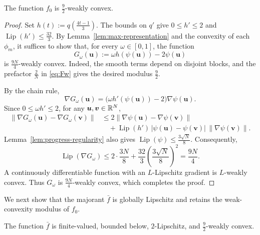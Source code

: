 \begin{lemma}
\label{lem:coupled-curvature}
The function $f_0$ is $\tfrac92$-weakly convex.
\end{lemma}
\begin{proof}
Set $h(t):=q(\tfrac{4t-1}{3})$. The bounds on $q'$ give $0\le h'\le2$ and
$\operatorname{Lip}(h')\le \tfrac{32}{3}$.
By Lemma~\ref{lem:max-representation} and the convexity
of each $\phi_m$, it suffices to show that, for every
$\omega\in[0,1]$, the function
\[
 G_\omega(\bm u)
 :=\omega h(\psi(\bm u))-2\psi(\bm u)
\]
is $\tfrac{9N}{4}$-weakly convex. Indeed, the smooth terms depend
on disjoint blocks, and the prefactor $\tfrac{2}{N}$ in
\eqref{eq:Fw} gives the desired modulus $\tfrac92$. 

By the chain rule,
\[
 \nabla G_\omega(\bm u)
 =
 \bigl(\omega h'(\psi(\bm u))-2\bigr)\nabla\psi(\bm u).
\]
Since $0\le\omega h'\le2$, for any $\bm u,\bm v\in{\mathbb{R}}^N$,
\begin{align*}
 \|\nabla G_\omega(\bm u)-\nabla G_\omega(\bm v)\|
 &\le
 2\|\nabla\psi(\bm u)-\nabla\psi(\bm v)\|\\
 &\quad+
 \operatorname{Lip}(h')\,|\psi(\bm u)-\psi(\bm v)|
 \,\|\nabla\psi(\bm v)\|.
\end{align*}
Lemma~\ref{lem:progress-regularity} also gives
$\operatorname{Lip}(\psi)\le \tfrac{3\sqrt N}{8}$. Consequently,
\[
 \operatorname{Lip}(\nabla G_\omega)
 \le
 2\cdot\frac{3N}{8}
 +\frac{32}{3}\left(\frac{3\sqrt N}{8}\right)^2
 =\frac{9N}{4}.
\]
A continuously differentiable function with an
$L$-Lipschitz gradient is $L$-weakly convex.
Thus $G_\omega$ is $\tfrac{9N}{4}$-weakly convex, which
completes the proof.
\end{proof}
We next show that the majorant $\bar f$
is globally Lipschitz and retains the weak-convexity modulus of $f_0$.
\begin{proposition}
\label{prop:regularity}
The function $\bar f$ is finite-valued, bounded below,
$2$-Lipschitz, and $\tfrac92$-weakly convex.
\end{proposition}

